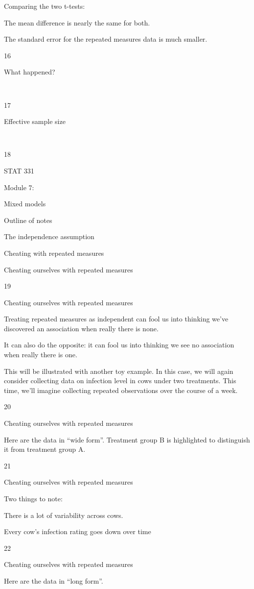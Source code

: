 \documentclass[
  letterpaper,
  DIV=11,
  numbers=noendperiod]{scrreprt}
\begin{document}
Comparing the two t-tests:

The mean difference is nearly the same for both.

The standard error for the repeated measures data is much smaller.

16

What happened?

~

17

Effective sample size

~

18

STAT 331

Module 7:

Mixed models

Outline of notes

The independence assumption

Cheating with repeated measures

Cheating ourselves with repeated measures

19

Cheating ourselves with repeated measures

Treating repeated measures as independent can fool us into thinking
we've discovered an association when really there is none.

It can also do the opposite: it can fool us into thinking we see no
association when really there is one.

This will be illustrated with another toy example. In this case, we will
again consider collecting data on infection level in cows under two
treatments. This time, we'll imagine collecting repeated observations
over the course of a week.

20

Cheating ourselves with repeated measures

Here are the data in ``wide form''. Treatment group B is highlighted to
distinguish it from treatment group A.

21

Cheating ourselves with repeated measures

Two things to note:

There is a lot of variability across cows.

Every cow's infection rating goes down over time

22

Cheating ourselves with repeated measures

Here are the data in ``long form''.
\end{document}
